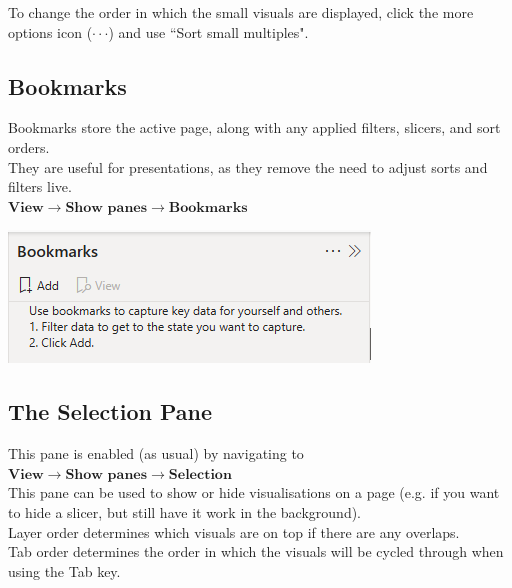 \documentclass[10pt, openany, twocolumn]{book}
\begin{document}
To change the order in which the small visuals are displayed, click the more options icon ($\cdot \cdot \cdot$) and use ``Sort small multiples".

\subsection*{Bookmarks}

Bookmarks store the active page, along with any applied filters, slicers, and sort orders.\\

They are useful for presentations, as they remove the need to adjust sorts and filters live.\\

$\textbf{View} \rightarrow \textbf{Show panes} \rightarrow \textbf{Bookmarks}$

\begin{center}
    \includegraphics[width=0.95\columnwidth]{images/bookmarks.png}
\end{center}

\subsection*{The Selection Pane}

This pane is enabled (as usual) by navigating to \\

$\textbf{View} \rightarrow \textbf{Show panes} \rightarrow \textbf{Selection}$ \\

This pane can be used to show or hide visualisations on a page (e.g. if you want to hide a slicer, but still have it work in the background). \\

Layer order determines which visuals are on top if there are any overlaps. \\

Tab order determines the order in which the visuals will be cycled through when using the Tab key.\\
\end{document}
